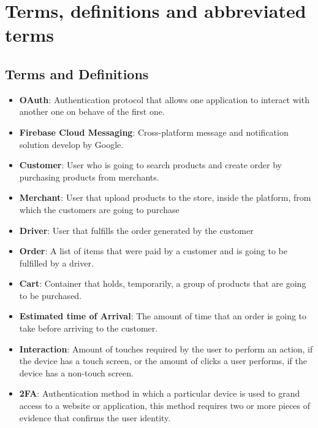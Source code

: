 \section{Terms, definitions and abbreviated terms}
\subsection{Terms and Definitions}
\begin{itemize}
    \item \textbf{OAuth}: Authentication protocol that allows one application 
    to interact with another one on behave of the first one.
    \item \textbf{Firebase Cloud Messaging}: Cross-platform message and 
    notification solution develop by Google.
    \item \textbf{Customer}: User who is going to search products and create 
    order by purchasing products from merchants.
    \item \textbf{Merchant}: User that upload products to the store, 
    inside the platform, from which the customers are going to purchase 
    \item \textbf{Driver}: User that fulfills the order generated by the 
    customer 
    \item \textbf{Order}: A list of items that were paid by a customer and 
    is going to be fulfilled by a driver.
    \item \textbf{Cart}: Container that holds, temporarily, a group of products 
    that are going to be purchased.
    \item \textbf{Estimated time of Arrival}: The amount of time that 
    an order is going to take before arriving to the customer.
    \item \textbf{Interaction}: Amount of touches required by the user to 
    perform an action, if the device has a touch screen, or the amount of 
    clicks a user performs, if the device has a non-touch screen.
    \item \textbf{2FA}: Authentication method in which a particular device is 
    used to grand access to a website or application, this method requires 
    two or more pieces of evidence that confirms the user identity.
\end{itemize}
\pagebreak

